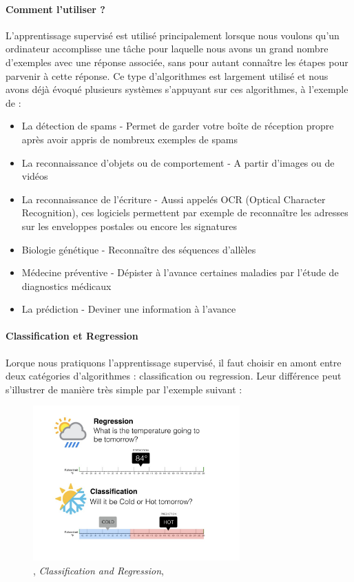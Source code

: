 \paragraph{Comment l'utiliser ?} L'apprentissage supervisé est utilisé principalement lorsque nous voulons qu'un ordinateur accomplisse une tâche pour laquelle nous avons un grand nombre
d'exemples avec une réponse associée, sans pour autant connaître les étapes pour parvenir à cette réponse. Ce type d'algorithmes est largement utilisé et nous avons déjà évoqué plusieurs
systèmes s'appuyant sur ces algorithmes, à l'exemple de :
\begin{itemize}
    \item La détection de spams - Permet de garder votre boîte de réception propre après avoir appris de nombreux exemples de spams
    \item La reconnaissance d'objets ou de comportement - A partir d'images ou de vidéos
    \item La reconnaissance de l'écriture - Aussi appelés OCR (Optical Character Recognition), ces logiciels permettent par exemple de reconnaître les adresses sur les
    enveloppes postales ou encore les signatures
    \item Biologie génétique - Reconnaître des séquences d'allèles
    \item Médecine préventive - Dépister à l'avance certaines maladies par l'étude de diagnostics médicaux
    \item La prédiction - Deviner une information à l'avance \cite{MachineLearning2}
\end{itemize}

\paragraph{Classification et Regression} Lorque nous pratiquons l'apprentissage supervisé, il faut choisir en amont entre deux catégories d'algorithmes : classification ou
regression. Leur différence peut s'illustrer de manière très simple par l'exemple suivant :

\begin{figure}[h]
    \centering
    \includegraphics[width=300px]{chapters/03/images/classification-regression.jpg}
    \caption{\label{supervised learning}, \emph{Classification and Regression}, \cite{MachineLearning6}}
\end{figure}

